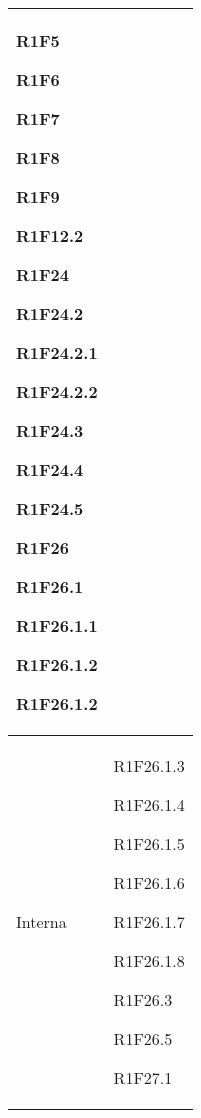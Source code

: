 \begin{center}
\begin{longtable}{|p{44mm}|p{22mm}|}
R1F5 \newline

R1F6 \newline

R1F7 \newline

R1F8 \newline

R1F9 \newline

R1F12.2 \newline

R1F24 \newline

R1F24.2 \newline

R1F24.2.1 \newline

R1F24.2.2 \newline

R1F24.3 \newline

R1F24.4 \newline

R1F24.5 \newline

R1F26 \newline

R1F26.1 \newline

R1F26.1.1 \newline

R1F26.1.2 \newline

R1F26.1.2
\\
\hline
Interna &
R1F26.1.3 \newline

R1F26.1.4 \newline

R1F26.1.5 \newline

R1F26.1.6 \newline

R1F26.1.7 \newline

R1F26.1.8 \newline

R1F26.3 \newline

R1F26.5 \newline

R1F27.1 \newline


\end{longtable}
\end{center}
